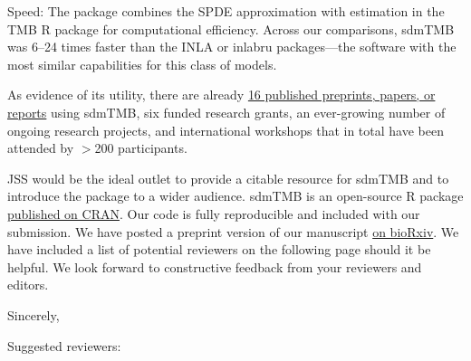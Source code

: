 \documentclass[letterpaper]{letter}
\providecommand{\pkg}[1]{{\normalfont\fontseries{b}\selectfont #1}}
\let\proglang=\textsf
\begin{document}
\begin{letter}{}
Speed: The package combines the SPDE approximation with estimation in the \pkg{TMB} \proglang{R} package for computational efficiency. Across our comparisons, \pkg{sdmTMB} was 6--24 times faster than the \pkg{INLA} or \pkg{inlabru} packages---the software with the most similar capabilities for this class of models.

As evidence of its utility, there are already \href{https://github.com/pbs-assess/sdmTMB/wiki/Publications-using-sdmTMB}{16 published preprints, papers, or reports} using \pkg{sdmTMB}, six funded research grants, an ever-growing number of ongoing research projects, and international workshops that in total have been attended by $>$200 participants.


JSS would be the ideal outlet to provide a citable resource for \pkg{sdmTMB} and to introduce the package to a wider audience. \pkg{sdmTMB} is an open-source \proglang{R} package \href{https://CRAN.R-project.org/package=sdmTMB}{published on CRAN}. Our code is fully reproducible and included with our submission. We have posted a preprint version of our manuscript \href{https://doi.org/10.1101/2022.03.24.485545}{on bioRxiv}.  We have included a list of potential reviewers on the following page should it be helpful. We look forward to constructive feedback from your reviewers and editors.

\vspace{3mm}
\closing{Sincerely,\\
}

\vspace{6mm}

Suggested reviewers:



\end{letter}
\end{document}

